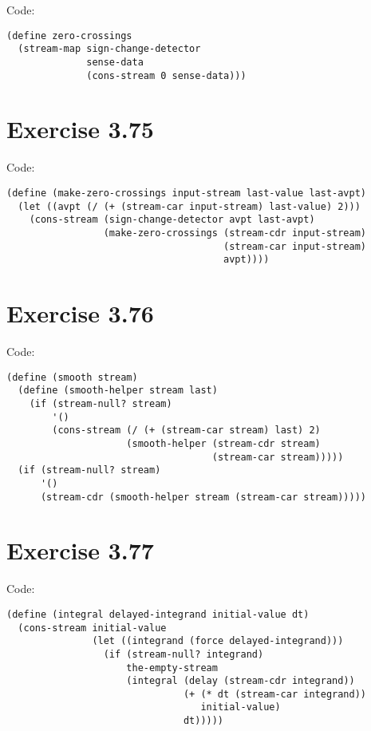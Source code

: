 \documentclass[../main.tex]{subfiles}
\begin{document}
Code:

\begin{lstlisting}
(define zero-crossings
  (stream-map sign-change-detector
              sense-data
              (cons-stream 0 sense-data)))
\end{lstlisting}

\section{Exercise 3.75}

Code:

\begin{lstlisting}
(define (make-zero-crossings input-stream last-value last-avpt)
  (let ((avpt (/ (+ (stream-car input-stream) last-value) 2)))
    (cons-stream (sign-change-detector avpt last-avpt)
                 (make-zero-crossings (stream-cdr input-stream)
                                      (stream-car input-stream)
                                      avpt))))
\end{lstlisting}

\section{Exercise 3.76}

Code:

\begin{lstlisting}
(define (smooth stream)
  (define (smooth-helper stream last)
    (if (stream-null? stream)
        '()
        (cons-stream (/ (+ (stream-car stream) last) 2)
                     (smooth-helper (stream-cdr stream)
                                    (stream-car stream)))))
  (if (stream-null? stream)
      '()
      (stream-cdr (smooth-helper stream (stream-car stream)))))
\end{lstlisting}

\section{Exercise 3.77}

Code:

\begin{lstlisting}
(define (integral delayed-integrand initial-value dt)
  (cons-stream initial-value
               (let ((integrand (force delayed-integrand)))
                 (if (stream-null? integrand)
                     the-empty-stream
                     (integral (delay (stream-cdr integrand))
                               (+ (* dt (stream-car integrand))
                                  initial-value)
                               dt)))))
\end{lstlisting}
\end{document}
